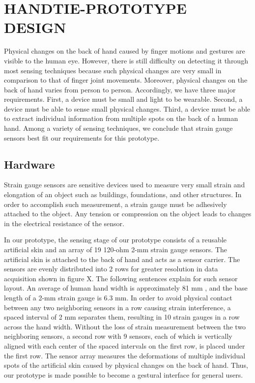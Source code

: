 \documentclass{sigchi}
\begin{document}


\section{HANDTIE-PROTOTYPE DESIGN}

Physical changes on the back of hand caused by finger motions and gestures are visible to the human eye. However, there is still difficulty on detecting it through most sensing techniques because such physical changes are very small in comparison to that of finger joint movements. Moreover, physical changes on the back of hand varies from person to person. Accordingly, we have three major requirements. First, a device must be small and light to be wearable. Second, a device must be able to sense small physical changes. Third, a device must be able to extract individual information from multiple spots on the back of a human hand. Among a variety of sensing techniques, we conclude that strain gauge sensors best fit our requirements for this prototype.

\subsection{Hardware} 
Strain gauge sensors are sensitive devices used to measure very small strain and elongation of an object such as buildings, foundations, and other structures. In order to accomplish such measurement, a strain gauge must be adhesively attached to the object. Any tension or compression on the object leads to changes in the electrical resistance of the sensor.



In our prototype, the sensing stage of our prototype consists of a reusable artificial skin and an array of 19 120-ohm 2-mm strain gauge sensors. The artificial skin is attached to the back of hand and acts as a sensor carrier. The sensors are evenly distributed into 2 rows for greater resolution in data acquisition shown in figure X. The following sentences explain for such sensor layout. An average of human hand width is approximately 81 mm \cite{Kulaksiz2002257}, and the base length of a 2-mm strain gauge is 6.3 mm. In order to avoid physical contact between any two neighboring sensors in a row causing strain interference, a spaced interval of 2 mm separates them, resulting in 10 strain gauges in a row across the hand width. Without the loss of strain measurement between the two neighboring sensors, a second row with 9 sensors, each of which is vertically aligned with each center of the spaced intervals on the first row, is placed under the first row. The sensor array measures the deformations of multiple individual spots of the artificial skin caused by physical changes on the back of hand. Thus, our prototype is made possible to become a gestural interface for general users.
\end{document}
